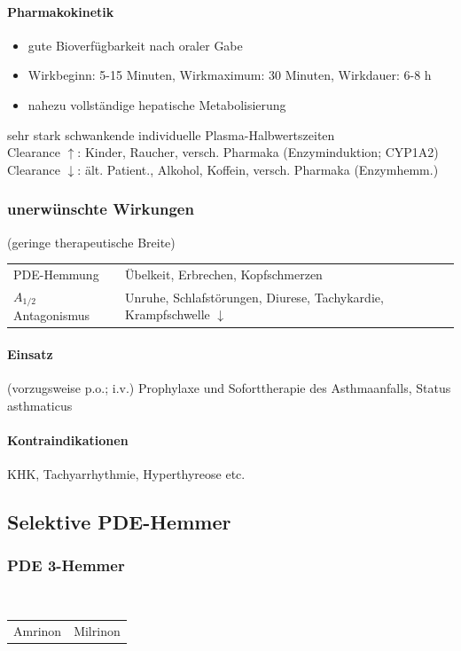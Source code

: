 \documentclass[10pt,a4paper]{report}
\begin{document}
\paragraph{Pharmakokinetik}
\begin{itemize}
	\item gute Bioverfügbarkeit nach oraler Gabe 
	\item Wirkbeginn: 5-15 Minuten, Wirkmaximum: 30 Minuten, Wirkdauer: 6-8 h
	\item nahezu vollständige hepatische Metabolisierung
\end{itemize}
sehr stark schwankende individuelle Plasma-Halbwertszeiten\\
Clearance $\uparrow$:	Kinder, Raucher, versch. Pharmaka (Enzyminduktion; CYP1A2)\\
Clearance $\downarrow$:	ält. Patient., Alkohol, Koffein, versch. Pharmaka (Enzymhemm.)

\subsubsection{unerwünschte Wirkungen}(geringe therapeutische Breite) 
\begin{tabularx}{\textwidth}{XX}
PDE-Hemmung&Übelkeit, Erbrechen, Kopfschmerzen\\ 
$A_{1/2}$ Antagonismus&Unruhe, Schlafstörungen, Diurese, Tachykardie,  Krampfschwelle $\downarrow$\\
\end{tabularx}

\paragraph{Einsatz}(vorzugsweise p.o.; i.v.) Prophylaxe und Soforttherapie des Asthmaanfalls, Status asthmaticus 

\paragraph{Kontraindikationen} KHK, Tachyarrhythmie, Hyperthyreose etc.

\subsection{Selektive PDE-Hemmer}
\subsubsection{PDE 3-Hemmer} \mbox{} \\
\begin{tabularx}{\textwidth}{XX}
Amrinon&Milrinon\\
\end{tabularx}
\end{document}
